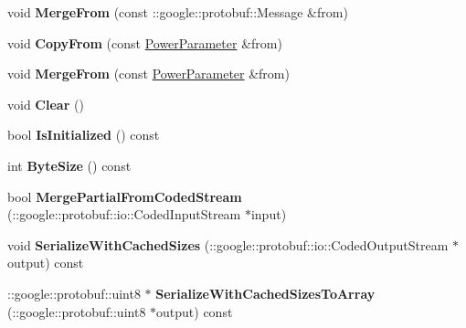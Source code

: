 \begin{DoxyCompactItemize}
void {\bfseries Merge\+From} (const \+::google\+::protobuf\+::\+Message \&from)
\item 
\mbox{\label{classcaffe_1_1_power_parameter_a9ffd6f85b7143d6ad75a43f980d35e50}} 
void {\bfseries Copy\+From} (const \mbox{\hyperlink{classcaffe_1_1_power_parameter}{Power\+Parameter}} \&from)
\item 
\mbox{\label{classcaffe_1_1_power_parameter_ad3cc912445bf3fa37601c587cf4e1b9d}} 
void {\bfseries Merge\+From} (const \mbox{\hyperlink{classcaffe_1_1_power_parameter}{Power\+Parameter}} \&from)
\item 
\mbox{\label{classcaffe_1_1_power_parameter_af8f5a49d411b97cebb6633c49544c52f}} 
void {\bfseries Clear} ()
\item 
\mbox{\label{classcaffe_1_1_power_parameter_ad549c1d142b2d0a8b6c1f68ece301b03}} 
bool {\bfseries Is\+Initialized} () const
\item 
\mbox{\label{classcaffe_1_1_power_parameter_adc0b891edd2fdfa8e6d9822beb9f1c93}} 
int {\bfseries Byte\+Size} () const
\item 
\mbox{\label{classcaffe_1_1_power_parameter_a48203e73454f0096b723c6cd005b2bc2}} 
bool {\bfseries Merge\+Partial\+From\+Coded\+Stream} (\+::google\+::protobuf\+::io\+::\+Coded\+Input\+Stream $\ast$input)
\item 
\mbox{\label{classcaffe_1_1_power_parameter_ab23f6083edf5d971ebf0eb6a778910ba}} 
void {\bfseries Serialize\+With\+Cached\+Sizes} (\+::google\+::protobuf\+::io\+::\+Coded\+Output\+Stream $\ast$output) const
\item 
\mbox{\label{classcaffe_1_1_power_parameter_ad57e7c8c6d138aa691227645397bf438}} 
\+::google\+::protobuf\+::uint8 $\ast$ {\bfseries Serialize\+With\+Cached\+Sizes\+To\+Array} (\+::google\+::protobuf\+::uint8 $\ast$output) const
\item 
\mbox{\label{classcaffe_1_1_power_parameter_a01b38e9f1ca732601c5021501eb0a0cb}} 

\end{DoxyCompactItemize}

